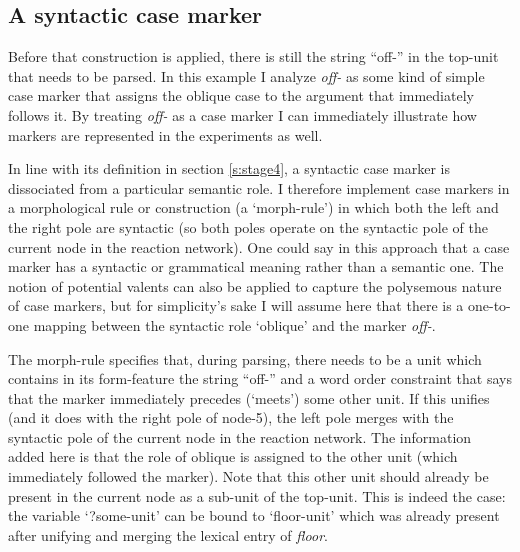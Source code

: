 \subsection{A syntactic case marker}
\label{s:morph-rule}

Before that construction is applied, there is still the string ``off-'' in the top-unit that needs to be parsed. In this example I analyze {\em off-} as some kind of simple case marker that assigns the oblique case to the argument that immediately follows it. By treating {\em off-} as a case marker I can immediately illustrate how markers are represented in the experiments as well.

In line with its definition in section \ref{s:stage4}, a syntactic case marker is dissociated from a particular semantic role. I therefore implement case markers in a morphological rule or construction (a `morph-rule') in which both the left and the right pole are syntactic (so both poles operate on the syntactic pole of the current node in the reaction network). One could say in this approach that a case marker has a syntactic or grammatical meaning rather than a semantic one. The notion of potential valents can also be applied to capture the polysemous nature of case markers, but for simplicity's sake I will assume here that there is a one-to-one mapping between the syntactic role `oblique' and the marker {\em off-}.

The morph-rule specifies that, during parsing, there needs to be a unit which contains in its form-feature the string ``off-'' and a word order constraint that says that the marker immediately precedes (`meets') some other unit. If this unifies (and it does with the right pole of node-5), the left pole merges with the syntactic pole of the current node in the reaction network. The information added here is that the role of oblique is assigned to the other unit (which immediately followed the marker). Note that this other unit should already be present in the current node as a sub-unit of the top-unit. This is indeed the case: the variable `?some-unit' can be bound to `floor-unit' which was already present after unifying and merging the lexical entry of {\em floor}.

